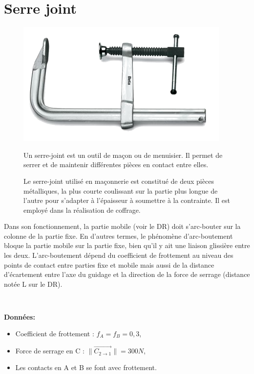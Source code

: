 \section{Serre joint}

\begin{figure}[!h]
  \begin{minipage}{0.35\linewidth}
  \centering\includegraphics[width=\linewidth]{img/serre-joint}
  \end{minipage}
  \hfill
  \begin{minipage}{0.60\linewidth}
Un serre-joint est un outil de maçon ou de menuisier. Il permet de serrer et de maintenir différentes pièces en contact entre elles.

Le serre-joint utilisé en maçonnerie est constitué de deux pièces métalliques, la plus courte coulissant sur la partie plus longue de l'autre pour s'adapter à l'épaisseur à soumettre à la contrainte. Il est employé dans la réalisation de coffrage. 
  \end{minipage}
\end{figure}

Dans son fonctionnement, la partie mobile (voir le DR) doit s'arc-bouter sur la colonne de la partie fixe. En d'autres termes, le phénomène d'arc-boutement bloque la partie mobile sur la partie fixe, bien qu'il y ait une liaison glissière entre les deux. L'arc-boutement dépend du coefficient de frottement au niveau des  points de contact entre parties fixe et mobile mais aussi de la distance d'écartement entre l'axe du guidage et la direction de la force de serrage (distance notée L sur le DR).  

~\

\textbf{Données:}

\begin{itemize}
 \item Coefficient de frottement : $f_A=f_B=0,3$,
 \item Force de serrage en C : $\|\overrightarrow{C_{2 \rightarrow 1}}\|=300N$,
 \item Les contacts en A et B se font avec frottement.
\end{itemize}

